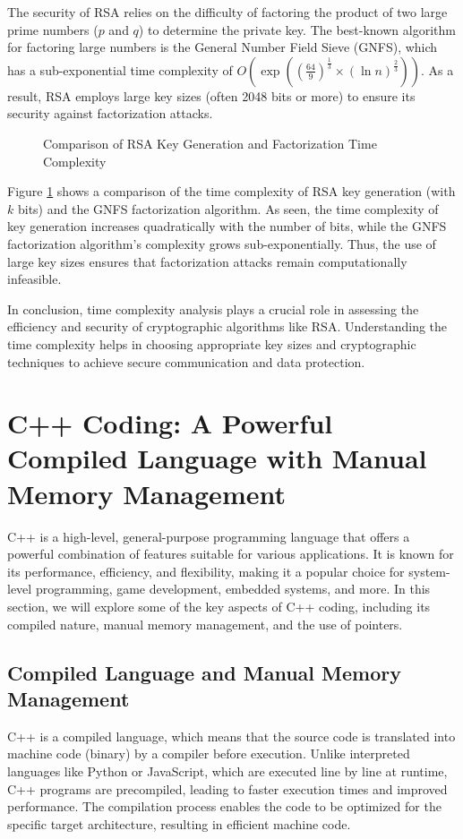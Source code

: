 \documentclass{article}
\begin{document}
The security of RSA relies on the difficulty of factoring the product of two large prime numbers (\(p\) and \(q\)) to determine the private key. The best-known algorithm for factoring large numbers is the General Number Field Sieve (GNFS), which has a sub-exponential time complexity of \(O(\exp\left(\left(\frac{64}{9}\right)^{\frac{1}{3}} \times (\ln n)^{\frac{2}{3}}\right))\). As a result, RSA employs large key sizes (often 2048 bits or more) to ensure its security against factorization attacks.

\begin{figure}[htbp]
    \centering
    \caption{Comparison of RSA Key Generation and Factorization Time Complexity}
    \label{fig:rsa_complexity}
\end{figure}

Figure \ref{fig:rsa_complexity} shows a comparison of the time complexity of RSA key generation (with \(k\) bits) and the GNFS factorization algorithm. As seen, the time complexity of key generation increases quadratically with the number of bits, while the GNFS factorization algorithm's complexity grows sub-exponentially. Thus, the use of large key sizes ensures that factorization attacks remain computationally infeasible.

In conclusion, time complexity analysis plays a crucial role in assessing the efficiency and security of cryptographic algorithms like RSA. Understanding the time complexity helps in choosing appropriate key sizes and cryptographic techniques to achieve secure communication and data protection.

\newpage

\section{C++ Coding: A Powerful Compiled Language with Manual Memory Management}
C++ is a high-level, general-purpose programming language that offers a powerful combination of features suitable for various applications. It is known for its performance, efficiency, and flexibility, making it a popular choice for system-level programming, game development, embedded systems, and more. In this section, we will explore some of the key aspects of C++ coding, including its compiled nature, manual memory management, and the use of pointers.

\subsection{Compiled Language and Manual Memory Management}
C++ is a compiled language, which means that the source code is translated into machine code (binary) by a compiler before execution. Unlike interpreted languages like Python or JavaScript, which are executed line by line at runtime, C++ programs are precompiled, leading to faster execution times and improved performance. The compilation process enables the code to be optimized for the specific target architecture, resulting in efficient machine code.
\end{document}
